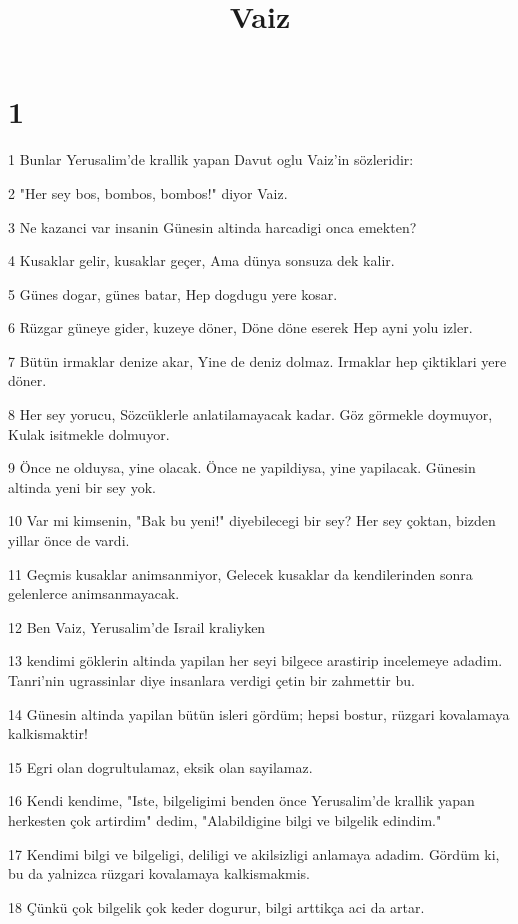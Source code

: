 

\title{Vaiz}


\chapter{1}

\par 1 Bunlar Yerusalim'de krallik yapan Davut oglu Vaiz'in sözleridir:
\par 2 "Her sey bos, bombos, bombos!" diyor Vaiz.
\par 3 Ne kazanci var insanin Günesin altinda harcadigi onca emekten?
\par 4 Kusaklar gelir, kusaklar geçer, Ama dünya sonsuza dek kalir.
\par 5 Günes dogar, günes batar, Hep dogdugu yere kosar.
\par 6 Rüzgar güneye gider, kuzeye döner, Döne döne eserek Hep ayni yolu izler.
\par 7 Bütün irmaklar denize akar, Yine de deniz dolmaz. Irmaklar hep çiktiklari yere döner.
\par 8 Her sey yorucu, Sözcüklerle anlatilamayacak kadar. Göz görmekle doymuyor, Kulak isitmekle dolmuyor.
\par 9 Önce ne olduysa, yine olacak. Önce ne yapildiysa, yine yapilacak. Günesin altinda yeni bir sey yok.
\par 10 Var mi kimsenin, "Bak bu yeni!" diyebilecegi bir sey? Her sey çoktan, bizden yillar önce de vardi.
\par 11 Geçmis kusaklar animsanmiyor, Gelecek kusaklar da kendilerinden sonra gelenlerce animsanmayacak.
\par 12 Ben Vaiz, Yerusalim'de Israil kraliyken
\par 13 kendimi göklerin altinda yapilan her seyi bilgece arastirip incelemeye adadim. Tanri'nin ugrassinlar diye insanlara verdigi çetin bir zahmettir bu.
\par 14 Günesin altinda yapilan bütün isleri gördüm; hepsi bostur, rüzgari kovalamaya kalkismaktir!
\par 15 Egri olan dogrultulamaz, eksik olan sayilamaz.
\par 16 Kendi kendime, "Iste, bilgeligimi benden önce Yerusalim'de krallik yapan herkesten çok artirdim" dedim, "Alabildigine bilgi ve bilgelik edindim."
\par 17 Kendimi bilgi ve bilgeligi, deliligi ve akilsizligi anlamaya adadim. Gördüm ki, bu da yalnizca rüzgari kovalamaya kalkismakmis.
\par 18 Çünkü çok bilgelik çok keder dogurur, bilgi arttikça aci da artar.

